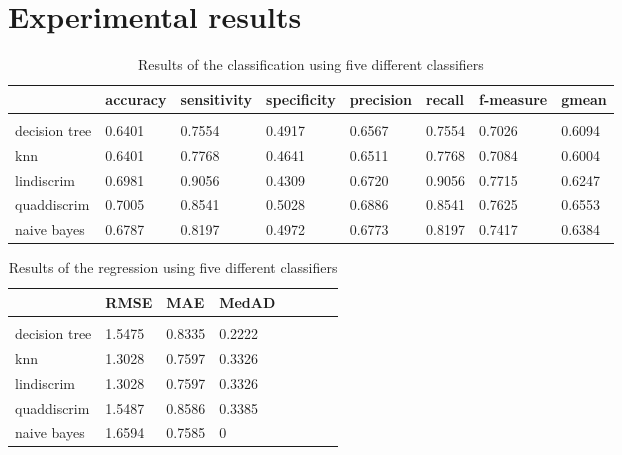 \documentclass{article} %
\begin{document}
\section{Experimental results}

\begin{table}[h]
\caption{Results of the classification using five different classifiers}
\label{classification}
\begin{center}
\begin{tabular}{@{}llllllll@{}}
                 & accuracy & sensitivity & specificity & precision & recall & f-measure & gmean \\
                 \hline \\
decision tree    & 0.6401   & 0.7554      & 0.4917      & 0.6567    & 0.7554 & 0.7026     & 0.6094 \\
knn              & 0.6401   & 0.7768      & 0.4641      & 0.6511    & 0.7768 & 0.7084     & 0.6004 \\
lindiscrim       & 0.6981   & 0.9056      & 0.4309      & 0.6720    & 0.9056 & 0.7715     & 0.6247 \\
quaddiscrim      & 0.7005   & 0.8541      & 0.5028      & 0.6886    & 0.8541 & 0.7625     & 0.6553 \\
naive bayes      & 0.6787   & 0.8197      & 0.4972      & 0.6773    & 0.8197 & 0.7417     & 0.6384 \\  
\end{tabular}
\end{center}
\end{table}

\begin{table}[h]
\caption{Results of the regression using five different classifiers}
\label{regression}
\begin{center}
\begin{tabular}{@{}llllllll@{}}
                 & RMSE & MAE & MedAD \\
                 \hline \\
decision tree	& 1.5475    & 0.8335    & 0.2222 \\
knn             & 1.3028    & 0.7597    & 0.3326  \\
lindiscrim      & 1.3028    & 0.7597    & 0.3326 \\
quaddiscrim     & 1.5487    & 0.8586    & 0.3385 \\
naive bayes     & 1.6594    & 0.7585   	& 0 \\  
\end{tabular}
\end{center}
\end{table}
\end{document}
